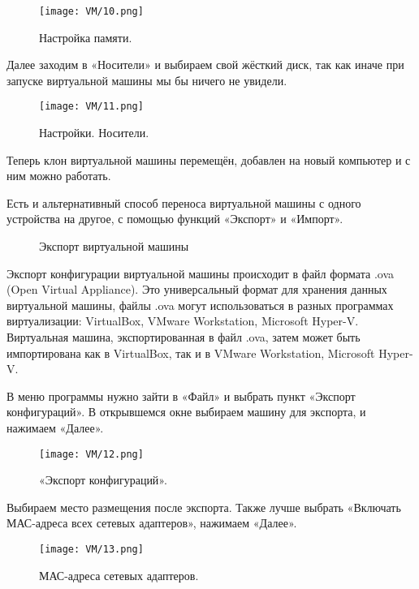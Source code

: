 \begin{figure}[h]
		\centering
		\texttt{[image: VM/10.png]}
\caption{Настройка памяти.}
\label{ris:image}
\end{figure}

\quad Далее заходим в «Носители» и выбираем свой жёсткий диск, так как иначе при запуске виртуальной машины мы бы ничего не увидели.

\begin{figure}[h]
		\centering
		\texttt{[image: VM/11.png]}
\caption{Настройки. Носители.}
\label{ris:image}
\end{figure}

\quad Теперь клон виртуальной машины перемещён, добавлен на новый компьютер и с ним можно работать.

\quad Есть и альтернативный способ переноса виртуальной машины с одного устройства на другое, с помощью функций «Экспорт» и «Импорт».

\begin{figure}[h]
\centering Экспорт виртуальной машины
\label{ris:image}
\end{figure}

\quad Экспорт конфигурации виртуальной машины происходит в файл формата .ova (Open Virtual Appliance). Это универсальный формат для хранения данных виртуальной машины, файлы .ova могут использоваться в разных программах виртуализации: VirtualBox, VMware Workstation, Microsoft Hyper-V. Виртуальная машина, экспортированная в файл .ova, затем может быть импортирована как в VirtualBox, так и в VMware Workstation, Microsoft Hyper-V.

\quad В меню программы нужно зайти в «Файл» и выбрать пункт «Экспорт конфигураций». В открывшемся окне выбираем машину для экспорта, и нажимаем «Далее».

\begin{figure}[h]
		\centering
		\texttt{[image: VM/12.png]}
\caption{«Экспорт конфигураций».}
\label{ris:image}

\end{figure}

\quad Выбираем место размещения после экспорта. Также лучше выбрать «Включать МАС-адреса всех сетевых адаптеров», нажимаем «Далее». 

\begin{figure}[h]
		\centering
		\texttt{[image: VM/13.png]}
\caption{МАС-адреса сетевых адаптеров.}
\label{ris:image}
\end{figure}

